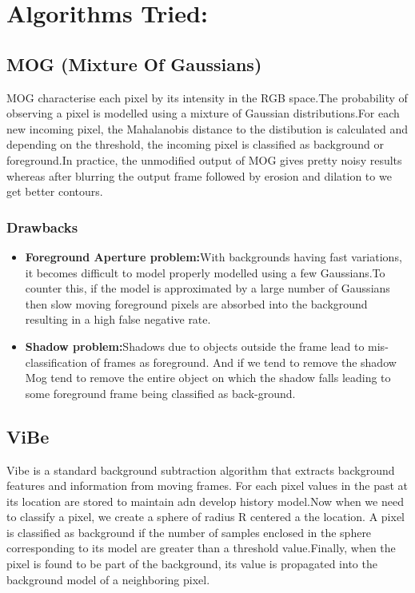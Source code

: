 \documentclass[12pt,a4paper]{report}
\begin{document}
\section*{Algorithms Tried:}
\subsection*{MOG (Mixture Of Gaussians)}
MOG characterise each pixel by its intensity in the RGB space.The probability of observing a pixel is modelled using a mixture of Gaussian distributions.For each new incoming pixel, the Mahalanobis distance to the distibution is calculated and depending on the threshold, the incoming pixel is classified as background or foreground.In practice, the unmodified output of MOG gives pretty noisy results whereas after blurring the output frame followed by erosion and dilation to we get better contours. 
\subsubsection{Drawbacks}
\begin{itemize}
\item {\bf Foreground Aperture problem:}With backgrounds having fast variations, it becomes difficult to model properly modelled using a few Gaussians.To counter this, if the model is approximated by a large number of Gaussians then slow moving foreground pixels are absorbed into the background resulting in a high false negative rate. 
\item {\bf Shadow problem:}Shadows due to objects outside the frame lead to mis-classification of frames as foreground. And if we tend to remove the shadow Mog tend to remove the entire object on which the shadow falls leading to some foreground frame being classified as back-ground.
\end{itemize} 
\subsection*{ViBe}
Vibe is a standard background subtraction algorithm that extracts background features and information from moving frames.
For each pixel values in the past at  its location are stored to maintain adn develop  history model.Now when we need to classify a pixel, we create a sphere of radius R centered a the location. A pixel is classified as background if the number of samples enclosed in the sphere corresponding to its model are greater than a threshold value.Finally, when the pixel is found to be part of the background, its value is propagated into the background model of a neighboring pixel. 
\end{document}
